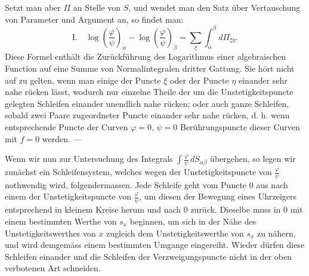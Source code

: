 \documentclass[10pt]{article}
\begin{document}
Setzt man aber \(\Pi\) an Stelle von \(S\), und wendet man den Satz über Vertauschung von Parameter und Argument an, so findet man:
\[
\mathrm{I.}\quad
\log\left(\frac{\varphi}{\psi}\right)_\alpha-\log\left(\frac{\varphi}{\psi}\right)_\beta
=\sum_{\xi}\int_{\alpha}^{\beta}d\Pi_{\xi\eta}.
\]
Diese Formel enthält die Zurückführung des Logarithmus einer algebraischen Function auf eine Summe von Normalintegralen dritter Gattung. Sie hört nicht auf zu gelten, wenn man einige der Puncte \(\xi\) oder der Puncte \(\eta\) einander sehr nahe rücken lässt, wodurch nur einzelne Theile der um die Unstetigkeitspuncte gelegten Schleifen einander unendlich nahe rücken; oder auch ganze Schleifen, sobald zwei Paare zugeordneter Puncte einander sehr nahe rücken, d. h. wenn entsprechende Puncte der Curven \(\varphi=0\), \(\psi=0\) Berührungspuncte dieser Curven mit \(f=0\) werden. —

Wenn wir nun zur Untersuchung des Integrals \(\int \frac{\varphi}{\psi}\,dS_{\alpha\beta}\) übergehen, so legen wir zunächst ein Schleifensystem, welches wegen der Unstetigkeitspuncte von \(\frac{\varphi}{\psi}\) nothwendig wird, folgendermassen. Jede Schleife geht vom Puncte \(0\) aus nach einem der Unstetigkeitspuncte von \(\frac{\varphi}{\psi}\), um diesen der Bewegung eines Uhrzeigers entsprechend in kleinem Kreise herum und nach \(0\) zurück. Dieselbe muss in \(0\) mit einem bestimmten Werthe von \(s_x\) beginnen, um sich in der Nähe des Unstetigkeitswerthes von \(x\) zugleich dem Unstetigkeitswerthe von \(s_x\) zu nähern, und wird demgemäss einem bestimmten Umgange eingereiht. Wieder dürfen diese Schleifen einander und die Schleifen der Verzweigungspuncte nicht in der oben verbotenen Art schneiden.
\end{document}

